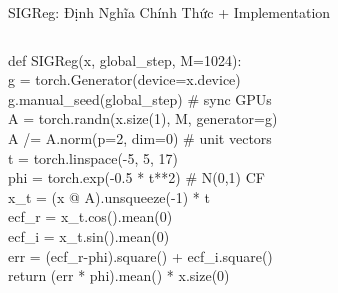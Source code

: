 \documentclass[aspectratio=169,9pt]{beamer}
\begin{document}
\begin{frame}[fragile]{SIGReg: Định Nghĩa Chính Thức + Implementation}
\begin{columns}[T]
\vspace{0.2em}
\begin{mdframed}[
  topline=false,bottomline=false,rightline=false,
  linewidth=2pt,linecolor=mprimary!50,
  backgroundcolor=mdark!5,
  innerleftmargin=6pt,innerrightmargin=4pt,
  innertopmargin=4pt,innerbottommargin=4pt
]
\tiny\ttfamily
def SIGReg(x, global\_step, M=1024):\\
\quad g = torch.Generator(device=x.device)\\
\quad g.manual\_seed(global\_step) \# sync GPUs\\
\quad A = torch.randn(x.size(1), M, generator=g)\\
\quad A /= A.norm(p=2, dim=0) \# unit vectors\\
\quad t = torch.linspace(-5, 5, 17)\\
\quad phi = torch.exp(-0.5 * t**2) \# N(0,1) CF\\
\quad x\_t = (x @ A).unsqueeze(-1) * t\\
\quad ecf\_r = x\_t.cos().mean(0)\\
\quad ecf\_i = x\_t.sin().mean(0)\\
\quad err = (ecf\_r-phi).square() + ecf\_i.square()\\
\quad return (err * phi).mean() * x.size(0)
\end{mdframed}

\end{columns}
\end{frame}
\end{document}
